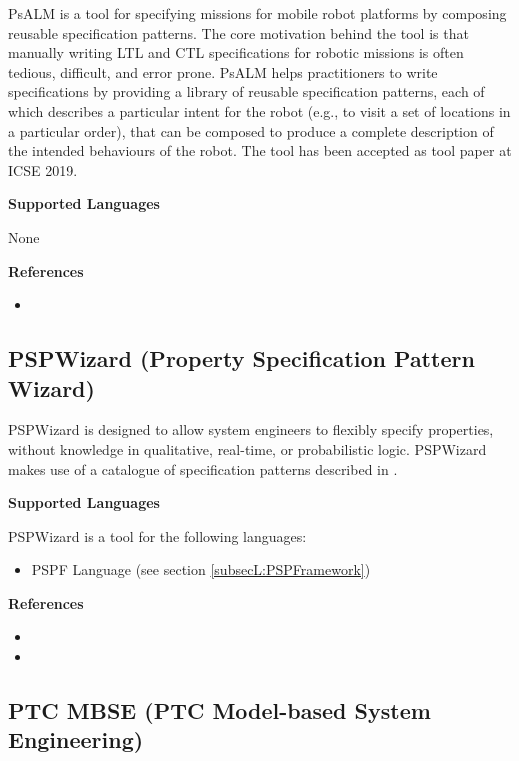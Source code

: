 PsALM is a tool for specifying missions for mobile robot platforms by composing reusable specification patterns. The core motivation behind the tool is that manually writing LTL and CTL specifications for robotic missions is often tedious, difficult, and error prone. PsALM helps practitioners to write specifications by providing a library of reusable specification patterns, each of which describes a particular intent for the robot (e.g., to visit a set of locations in a particular order), that can be composed to produce a complete description of the intended behaviours of the robot. The tool has been accepted as tool paper at ICSE 2019.

\textbf{Supported Languages}

None


\textbf{References}
\begin{itemize}
	
\item {}
\end{itemize}



\subsection{PSPWizard (Property Specification Pattern Wizard)}
\label{subsecT:PSPWizard}


PSPWizard is designed to allow system engineers to flexibly specify properties, without knowledge in qualitative, real-time, or probabilistic logic. PSPWizard makes use of a catalogue of specification patterns described in \cite{Autili2015}.

\textbf{Supported Languages}

PSPWizard is a tool for the following languages:
\begin{itemize}
	\item PSPF Language (see section \ref{subsecL:PSPFramework})
\end{itemize}


\textbf{References}
\begin{itemize}
	
\item {}
	
\item {}
\end{itemize}



\subsection{PTC MBSE (PTC Model-based System Engineering)}
\label{subsecT:PTCMBSE}


